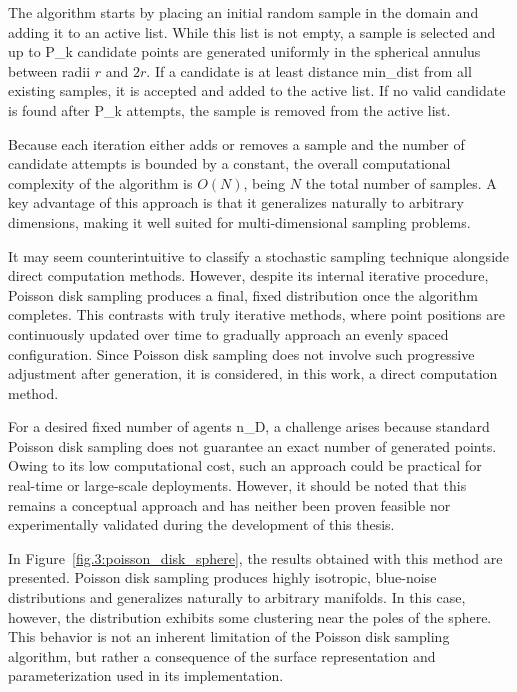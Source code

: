 The algorithm starts by placing an initial random sample in the domain and adding it to an active list. While this list is not empty, a sample is selected and up to \gls{P_k} candidate points are generated uniformly in the spherical annulus between radii \( r \) and \( 2r \). If a candidate is at least distance \gls{min_dist} from all existing samples, it is accepted and added to the active list. If no valid candidate is found after \gls{P_k} attempts, the sample is removed from the active list.

Because each iteration either adds or removes a sample and the number of candidate attempts is bounded by a constant, the overall computational complexity of the algorithm is \( O(N) \), being \( N \) the total number of samples. A key advantage of this approach is that it generalizes naturally to arbitrary dimensions, making it well suited for multi-dimensional sampling problems.

It may seem counterintuitive to classify a stochastic sampling technique alongside direct computation methods. However, despite its internal iterative procedure, Poisson disk sampling produces a final, fixed distribution once the algorithm completes. This contrasts with truly iterative methods, where point positions are continuously updated over time to gradually approach an evenly spaced configuration. Since Poisson disk sampling does not involve such progressive adjustment after generation, it is considered, in this work, a direct computation method.

For a desired fixed number of agents \gls{n_D}, a challenge arises because standard Poisson disk sampling does not guarantee an exact number of generated points. Owing to its low computational cost, such an approach could be practical for real-time or large-scale deployments. However, it should be noted that this remains a conceptual approach and has neither been proven feasible nor experimentally validated during the development of this thesis.

In Figure~\ref{fig.3:poisson_disk_sphere}, the results obtained with this method are presented. Poisson disk sampling produces highly isotropic, blue-noise distributions and generalizes naturally to arbitrary manifolds. In this case, however, the distribution exhibits some clustering near the poles of the sphere. This behavior is not an inherent limitation of the Poisson disk sampling algorithm, but rather a consequence of the surface representation and parameterization used in its implementation.

